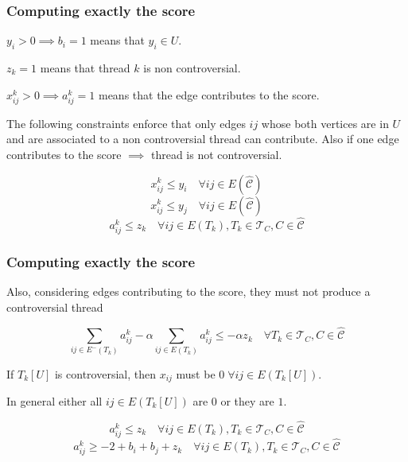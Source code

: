 \documentclass{beamer}
\begin{document}
\begin{frame}[c]
	\frametitle{Computing exactly the score}
	$y_{i} > 0 \implies b_i = 1$ means that $y_i \in U$.

	$z_k = 1$ means that thread $k$ is non controversial.

	$x_{ij}^{k}  > 0 \implies a_{ij}^{k} = 1 $ means that the edge contributes to the score.

	\bigskip

	The following constraints enforce that only edges $ij$ whose both vertices
	are in $U$ and are associated to a non controversial thread can contribute.
	Also if one edge contributes to the score $\implies $ thread is not
	controversial.

	\begin{equation*}
		x _{ij}^k \leq y_i \quad \forall ij \in E(\hat{\mathcal{C}})
	\end{equation*}
	\begin{equation*}
		x _{ij}^{k}  \leq y_j \quad \forall ij \in E(\hat{\mathcal{C}})
	\end{equation*}
	\begin{equation*}
		a _{ij} ^{k} \leq z_k \quad \forall ij \in E(T_k), T_k \in \mathcal{T} _{C}, C \in \hat{\mathcal{C} }
	\end{equation*}

\end{frame}

\begin{frame}[c]
	\frametitle{Computing exactly the score}
	Also, considering edges contributing to the score, they must not produce a
	controversial thread

	\begin{equation*}
		\sum^{}_{ij \in E^{-} (T_k)} a_{ij}^{k}  - \alpha \sum^{}_{ij \in E(T_k)}
		a_{ij}^k \leq - \alpha z_{k}  \quad \forall T_{k} \in \mathcal{T} _{C}, C \in
		\hat{\mathcal{C}}
	\end{equation*}

	If $T_{k} [U]$ is controversial, then $x_{ij} $ must be $0 \; \forall ij \in
		E(T_{k}[U] )$.

	\bigskip

	In general either all $ij \in E(T_{k}[U] )$ are $0$ or they are $1$.

	\begin{equation*}
		a _{ij}^{k}  \leq z_k \quad \forall ij \in E(T_k), T_k \in \mathcal{T} _{C}, C \in \hat{\mathcal{C} }
	\end{equation*}
	\begin{equation*}
		a _{ij} ^{k} \geq - 2 + b_i + b_j + z_k \quad \forall ij \in E(T_k), T_k \in \mathcal{T} _{C}, C \in \hat{\mathcal{C} }
	\end{equation*}
\end{frame}
\end{document}
